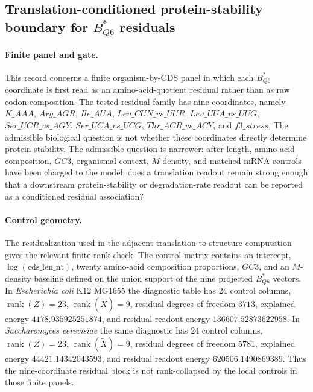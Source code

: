 \subsection{Translation-conditioned protein-stability boundary for $B^{\ast}_{Q6}$ residuals}
\label{sec:q6-translation-conditioned-protein-stability-boundary}

\paragraph{Finite panel and gate.}
This record concerns a finite organism-by-CDS panel in which each $B^{\ast}_{Q6}$ coordinate is first read as an amino-acid-quotient residual rather than as raw codon composition. The tested residual family has nine coordinates, namely $K\_AAA$, $Arg\_AGR$, $Ile\_AUA$, $Leu\_CUN\_vs\_UUR$, $Leu\_UUA\_vs\_UUG$, $Ser\_UCR\_vs\_AGY$, $Ser\_UCA\_vs\_UCG$, $Thr\_ACR\_vs\_ACY$, and $f3\_stress$. The admissible biological question is not whether these coordinates directly determine protein stability. The admissible question is narrower: after length, amino-acid composition, $GC3$, organismal context, $M$-density, and matched mRNA controls have been charged to the model, does a translation readout remain strong enough that a downstream protein-stability or degradation-rate readout can be reported as a conditioned residual association?

\paragraph{Control geometry.}
The residualization used in the adjacent translation-to-structure computation gives the relevant finite rank check. The control matrix contains an intercept, $\log(\mathrm{cds\_len\_nt})$, twenty amino-acid composition proportions, $GC3$, and an $M$-density baseline defined on the union support of the nine projected $B^{\ast}_{Q6}$ vectors. In \emph{Escherichia coli} K12 MG1655 the diagnostic table has $24$ control columns, $\operatorname{rank}(Z)=23$, $\operatorname{rank}(\widetilde X)=9$, residual degrees of freedom $3713$, explained energy $4178.935925251874$, and residual readout energy $136607.52873622958$. In \emph{Saccharomyces cerevisiae} the same diagnostic has $24$ control columns, $\operatorname{rank}(Z)=23$, $\operatorname{rank}(\widetilde X)=9$, residual degrees of freedom $5781$, explained energy $44421.14342043593$, and residual readout energy $620506.1490869389$. Thus the nine-coordinate residual block is not rank-collapsed by the local controls in those finite panels.

